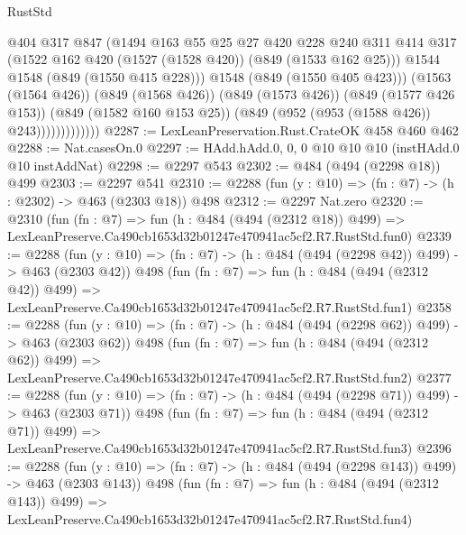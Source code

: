 \begin{lexlean}{RustStd}
\begin{coremodule}
                            @404
                            @317
                            @847
                            (@1494
                              @163
                              @55
                              @25
                              @27
                              @420
                              @228
                              @240
                              @311
                              @414
                              @317
                              (@1522 @162 @420 (@1527 (@1528 @420)) (@849 (@1533 @162 @25)))
                              @1544
                              @1548
                              (@849 (@1550 @415 @228)))
                            @1548
                            (@849 (@1550 @405 @423)))
                          (@1563 (@1564 @426))
                          (@849 (@1568 @426))
                          (@849 (@1573 @426))
                          (@849 (@1577 @426 @153))
                          (@849 (@1582 @160 @153 @25))
                          (@849 (@952 (@953 (@1588 @426)) @243)))))))))))))
@2287 := LexLeanPreservation.Rust.CrateOK @458 @460 @462
@2288 := Nat.casesOn.{0}
@2297 := HAdd.hAdd.{0, 0, 0} @10 @10 @10 (instHAdd.{0} @10 instAddNat)
@2298 := @2297 @543
@2302 := @484 (@494 (@2298 @18)) @499
@2303 := @2297 @541
@2310 := @2288 (fun (y : @10) => (fn : @7) -> (h : @2302) -> @463 (@2303 @18)) @498
@2312 := @2297 Nat.zero
@2320 := @2310
    (fun (fn : @7) =>
    fun (h : @484 (@494 (@2312 @18)) @499) =>
    LexLeanPreserve.Ca490cb1653d32b01247e470941ac5cf2.R7.RustStd.fun0)
@2339 := @2288
    (fun (y : @10) => (fn : @7) -> (h : @484 (@494 (@2298 @42)) @499) -> @463 (@2303 @42))
    @498
    (fun (fn : @7) =>
    fun (h : @484 (@494 (@2312 @42)) @499) =>
    LexLeanPreserve.Ca490cb1653d32b01247e470941ac5cf2.R7.RustStd.fun1)
@2358 := @2288
    (fun (y : @10) => (fn : @7) -> (h : @484 (@494 (@2298 @62)) @499) -> @463 (@2303 @62))
    @498
    (fun (fn : @7) =>
    fun (h : @484 (@494 (@2312 @62)) @499) =>
    LexLeanPreserve.Ca490cb1653d32b01247e470941ac5cf2.R7.RustStd.fun2)
@2377 := @2288
    (fun (y : @10) => (fn : @7) -> (h : @484 (@494 (@2298 @71)) @499) -> @463 (@2303 @71))
    @498
    (fun (fn : @7) =>
    fun (h : @484 (@494 (@2312 @71)) @499) =>
    LexLeanPreserve.Ca490cb1653d32b01247e470941ac5cf2.R7.RustStd.fun3)
@2396 := @2288
    (fun (y : @10) => (fn : @7) -> (h : @484 (@494 (@2298 @143)) @499) -> @463 (@2303 @143))
    @498
    (fun (fn : @7) =>
    fun (h : @484 (@494 (@2312 @143)) @499) =>
    LexLeanPreserve.Ca490cb1653d32b01247e470941ac5cf2.R7.RustStd.fun4)

\end{coremodule}
\end{lexlean}
